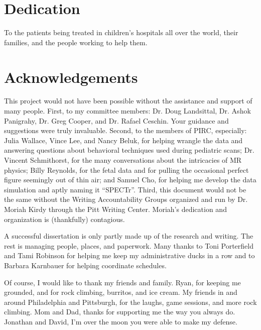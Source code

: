 \documentclass[hidelinks,pdflatex,final]{pittetd}
\begin{document}
\tableofcontents
\listoftables                     
\listoffigures                     

\preface

\section{Dedication}
To the patients being treated in children's hospitals all over the world, their families, and the people working to help them.         

\clearpage

\section{Acknowledgements}

This project would not have been possible without the assistance and support of many people. First, to my committee members: Dr. Doug Landsittal, Dr. Ashok Panigrahy, Dr. Greg Cooper, and Dr. Rafael Ceschin. Your guidance and suggestions were truly invaluable. Second, to the members of PIRC, especially: Julia Wallace, Vince Lee, and Nancy Beluk, for helping wrangle the data and answering questions about behavioral techniques used during pediatric scans; Dr. Vincent Schmithorst, for the many conversations about the intricacies of MR physics; Billy Reynolds, for the fetal data and for pulling the occasional perfect figure seemingly out of thin air; and Samuel Cho, for helping me develop the data simulation and aptly naming it ``SPECTr''. Third, this document would not be the same without the Writing Accountability Groups organized and run by Dr. Moriah Kirdy through the Pitt Writing Center. Moriah's dedication and organization is (thankfully) contagious. 

A successful dissertation is only partly made up of the research and writing. The rest is managing people, places, and paperwork. Many thanks to Toni Porterfield and Tami Robinson for helping me keep my administrative ducks in a row and to Barbara Karnbauer for helping coordinate schedules. 

Of course, I would like to thank my friends and family. Ryan, for keeping me grounded, and for rock climbing, burritos, and ice cream. My friends in and around Philadelphia and Pittsburgh, for the laughs, game sessions, and more rock climbing. Mom and Dad, thanks for supporting me the way you always do. Jonathan and David, I'm over the moon you were able to make my defense. 
\end{document}
